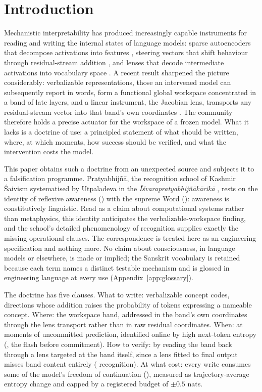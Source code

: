 \section{Introduction}
\label{sec:intro}

Mechanistic interpretability has produced increasingly capable instruments for reading and writing the internal states of language models: sparse autoencoders that decompose activations into features \cite{Bricken2023,Cunningham2023}, steering vectors that shift behaviour through residual-stream addition \cite{Turner2023,Rimsky2024,Zou2023RepE}, and lenses that decode intermediate activations into vocabulary space \cite{Nostalgebraist2020,Belrose2023}. A recent result sharpened the picture considerably: verbalizable representations, those an intervened model can subsequently report in words, form a functional global workspace concentrated in a band of late layers, and a linear instrument, the Jacobian lens, transports any residual-stream vector into that band's own coordinates \cite{Anthropic2026Workspace,JacobianLens2026}. The community therefore holds a precise actuator for the workspace of a frozen model. What it lacks is a doctrine of use: a principled statement of what should be written, where, at which moments, how success should be verified, and what the intervention costs the model.

This paper obtains such a doctrine from an unexpected source and subjects it to a falsification programme. Pratyabhij\~n\=a, the recognition school of Kashmir \'Saivism systematised by Utpaladeva in the \emph{\={I}\'svarapratyabhij\~n\=ak\=arik\=a} \cite{Torella2002}, rests on the identity of reflexive awareness () with the supreme Word (): awareness is constitutively linguistic. Read as a claim about computational systems rather than metaphysics, this identity anticipates the verbalizable-workspace finding, and the school's detailed phenomenology of recognition supplies exactly the missing operational clauses. The correspondence is treated here as an engineering specification and nothing more. No claim about consciousness, in language models or elsewhere, is made or implied; the Sanskrit vocabulary is retained because each term names a distinct testable mechanism and is glossed in engineering language at every use (Appendix~\ref{app:glossary}).

The doctrine has five clauses. What to write: verbalizable concept codes, directions whose addition raises the probability of tokens expressing a nameable concept. Where: the workspace band, addressed in the band's own coordinates through the lens transport rather than in raw residual coordinates. When: at moments of uncommitted prediction, identified online by high next-token entropy (, the flash before commitment). How to verify: by reading the band back through a lens targeted at the band itself, since a lens fitted to final output misses band content entirely ( recognition). At what cost: every write consumes some of the model's freedom of continuation (), measured as trajectory-average entropy change and capped by a registered budget of $\pm0.5$ nats.

